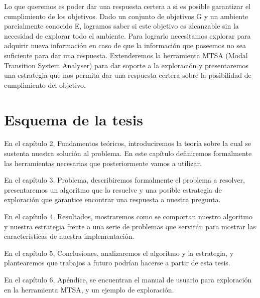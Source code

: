 \vspace{\baselineskip}
Lo que queremos es poder dar una respuesta certera a si es posible garantizar el cumplimiento de los objetivos. 
Dado un conjunto de objetivos G y un ambiente parcialmente conocido E, logramos saber si este objetivo es alcanzable
sin la necesidad de explorar todo el ambiente.
Para lograrlo necesitamos explorar para adquirir nueva información en caso de que la información que poseemos no sea 
suficiente para dar una respuesta. Extenderemos la herramienta MTSA (Modal Transition System Analyser) para dar soporte 
a la exploración y presentaremos una estrategia que nos permita dar una respuesta certera sobre la posibilidad de 
cumplimiento del objetivo.

\section{Esquema de la tesis}

En el capítulo 2, Fundamentos teóricos, introduciremos la teoría sobre la cual se sustenta nuestra solución al problema. 
En este capítulo definiremos formalmente las herramientas necesarias que posteriormente vamos a utilizar.

\vspace{\baselineskip}
En el capítulo 3, Problema, describiremos formalmente el problema a resolver, presentaremos un algoritmo que lo resuelve 
y una posible estrategia de exploración que garantice encontrar una respuesta a nuestra pregunta.

\vspace{\baselineskip}
En el capítulo 4, Resultados, mostraremos como se comportan nuestro algoritmo y nuestra estrategia frente a una serie 
de problemas que servirán para mostrar las características de nuestra implementación.

\vspace{\baselineskip}
En el capítulo 5, Conclusiones, analizaremos el algoritmo y la estrategia, y plantearemos que trabajos a futuro podrían 
hacerse a partir de esta tesis. 

\vspace{\baselineskip}
En el capítulo 6, Apéndice, se encuentran el manual de usuario para exploración en la herramienta MTSA, y un ejemplo de exploración.
